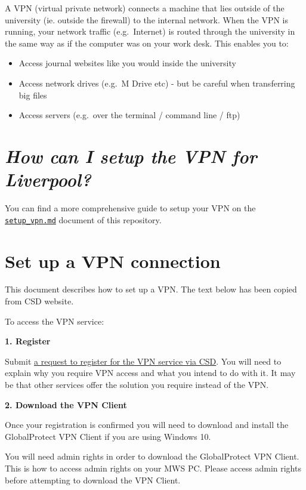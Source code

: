\documentclass[]{book}
\providecommand{\tightlist}{%
  \setlength{\itemsep}{0pt}\setlength{\parskip}{0pt}}
\begin{document}
A VPN (virtual private network) connects a machine that lies outside of
the university (ie. outside the firewall) to the internal network. When
the VPN is running, your network traffic (e.g.~Internet) is routed
through the university in the same way as if the computer was on your
work desk. This enables you to:

\begin{itemize}
\tightlist
\item
  Access journal websites like you would inside the university
\item
  Access network drives (e.g.~M Drive etc) - but be careful when
  transferring big files
\item
  Access servers (e.g.~over the terminal / command line / ftp)
\end{itemize}

\section{\texorpdfstring{\emph{How can I setup the VPN for
Liverpool?}}{How can I setup the VPN for Liverpool?}}\label{how-can-i-setup-the-vpn-for-liverpool}

You can find a more comprehensive guide to setup your VPN on the
\href{setup_vpn.md}{\texttt{setup\_vpn.md}} document of this repository.

\section{Set up a VPN connection}\label{set-up-a-vpn-connection}

This document describes how to set up a VPN. The text below has been
copied from CSD website.

To access the VPN service:

\textbf{1. Register}

Submit
\href{https://liverpool.service-now.com/sp?id=sc_cat_item\&sys_id=bd8d37f1376ba60051a3532e53990e3f}{a
request to register for the VPN service via CSD}. You will need to
explain why you require VPN access and what you intend to do with it. It
may be that other services offer the solution you require instead of the
VPN.

\textbf{2. Download the VPN Client}

Once your registration is confirmed you will need to download and
install the GlobalProtect VPN Client if you are using Windows 10.

You will need admin rights in order to download the GlobalProtect VPN
Client. This is how to access admin rights on your MWS PC. Please access
admin rights before attempting to download the VPN Client.
\end{document}
